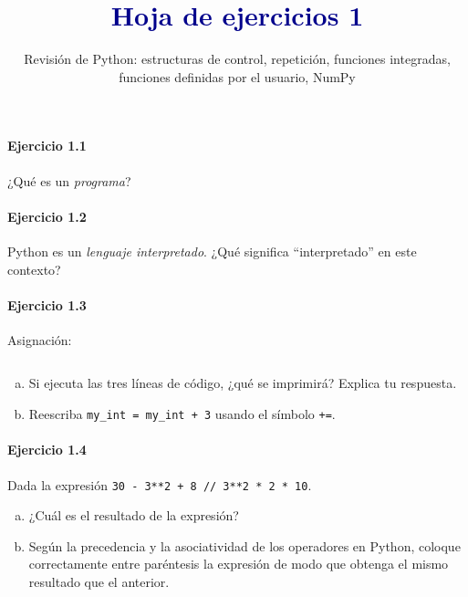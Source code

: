 


\title{\textcolor{DarkBlue}{Hoja de ejercicios 1}}
\subtitle{\color{DarkBlue}
  Revisión de Python:
  estructuras de control,
	repetición, 
  funciones integradas,
	funciones definidas por el usuario,
	NumPy
}



\maketitle

\paragraph{\color{DarkBlue}Ejercicio 1.1}
¿Qué es un \emph{programa}?

\paragraph{\color{DarkBlue}Ejercicio 1.2}
Python es un \emph{lenguaje interpretado}.
¿Qué significa ``interpretado'' en este contexto?

\paragraph{\color{DarkBlue}Ejercicio 1.3}
Asignación:
\begin{listing}[ht!]
	\inputminted{python}{1.3.py}
\end{listing}
\begin{enumerate}[(a)]
	\item

	      Si ejecuta las tres líneas de código, ¿qué se imprimirá?
	      Explica tu respuesta.

	\item

	      Reescriba \texttt{my_int = my_int + 3} usando el
	      símbolo \texttt{+=}.
\end{enumerate}

\paragraph{\color{DarkBlue}Ejercicio 1.4}
Dada la expresión
\texttt{30 - 3**2 + 8 // 3**2 * 2 * 10}.

\begin{enumerate}[(a)]
	\item

	      ¿Cuál es el resultado de la expresión?

	\item

	      Según la precedencia y la asociatividad de los operadores en
	      Python, coloque correctamente entre paréntesis la expresión
	      de modo que obtenga el mismo resultado que el anterior.
\end{enumerate}

